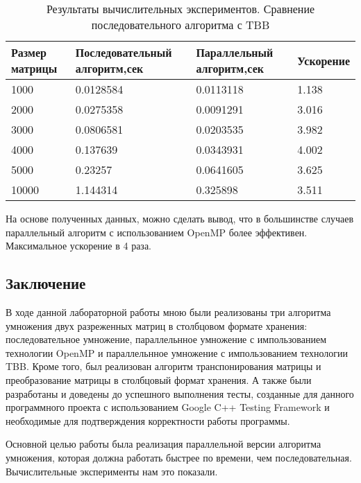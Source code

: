 \documentclass{report}
\begin{document}
\begin{table}[!h]
\caption{Результаты вычислительных экспериментов. Сравнение последовательного алгоритма с TBB}
\centering
\begin{tabular}{|p{4cm}|p{4cm}|p{4cm}|p{3cm}|}
\hline
Размер матрицы & Последовательный алгоритм,сек & Параллельный алгоритм,сек & Ускорение  \\\hline
1000  & 0.0128584 & 0.0113118 & 1.138  \\\hline
2000  & 0.0275358 & 0.0091291 & 3.016  \\\hline
3000  & 0.0806581 & 0.0203535 & 3.982  \\\hline
4000  & 0.137639 & 0.0343931 & 4.002  \\\hline
5000  & 0.23257 & 0.0641605 & 3.625  \\\hline
10000 & 1.144314 & 0.325898 & 3.511 \\
\hline
\end{tabular}
\end{table}

\par На основе полученных данных, можно сделать вывод, что в большинстве случаев параллельный алгоритм с использованием OpenMP более эффективен. Максимальное ускорение в 4 раза.
\newpage

\begin{center}
\section*{Заключение}
\end{center}
\par В ходе данной лабораторной работы мною были реализованы три алгоритма умножения двух разреженных матриц в столбцовом формате хранения: последовательное умножение, параллельнное умножение с импользованием технологии OpenMP и параллельнное умножение с импользованием технологии TBB. Кроме того, был реализован алгоритм транспонирования матрицы и преобразование матрицы в столбцовый формат хранения. А также были разработаны и доведены до успешного выполнения тесты, созданные для данного программного проекта с использованием Google C++ Testing Framework и необходимые для подтверждения корректности работы программы.
\par Основной целью работы была реализация параллельной версии алгоритма умножения, которая должна работать быстрее по времени, чем последовательная.
Вычислительные эксперименты нам это показали.
\newpage
\end{document}
